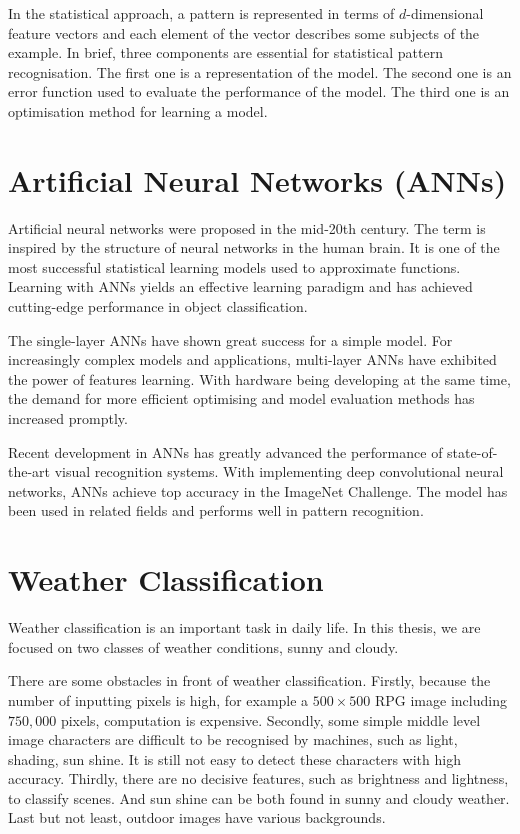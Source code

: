 In the statistical approach, a pattern is represented in terms of $d$-dimensional feature vectors and each element of the vector describes some subjects of the example. In brief, three components are essential for statistical pattern recognisation. The first one is a representation of the model. The second one is an error function used to evaluate the performance of the model. The third one is an optimisation method for learning a model.

\section{Artificial Neural Networks (ANNs)}

Artificial neural networks were proposed in the mid-20th century. The term is inspired by the structure of neural networks in the human brain. It is one of the most successful statistical learning models used to approximate functions. Learning with ANNs yields an effective learning paradigm and has achieved cutting-edge performance in object classification. 

The single-layer ANNs  have shown great success for a simple model. For increasingly complex models and applications, multi-layer ANNs have exhibited the power of features learning. With hardware being developing at the same time, the demand for more efficient optimising and model evaluation methods has increased promptly. 

Recent development in ANNs has greatly advanced the performance of state-of-the-art visual recognition systems. With implementing deep convolutional neural networks, ANNs achieve top accuracy in the ImageNet Challenge. The model has been used in related fields and performs well in pattern recognition.

\section{Weather Classification}

Weather classification is an important task in daily life. In this thesis, we are focused on two classes of weather conditions, sunny and cloudy. 

There are some obstacles in front of weather classification. Firstly, because the number of inputting pixels is high, for example a $500 \times 500$ RPG image including $750,000$ pixels, computation is expensive. Secondly, some simple middle level image characters are difficult to be recognised by machines, such as light, shading, sun shine. It is still not easy to detect these characters with high accuracy. Thirdly, there are no decisive features, such as brightness and lightness, to classify scenes. And sun shine can be both found in sunny and cloudy weather. Last but not least, outdoor images have various backgrounds.


